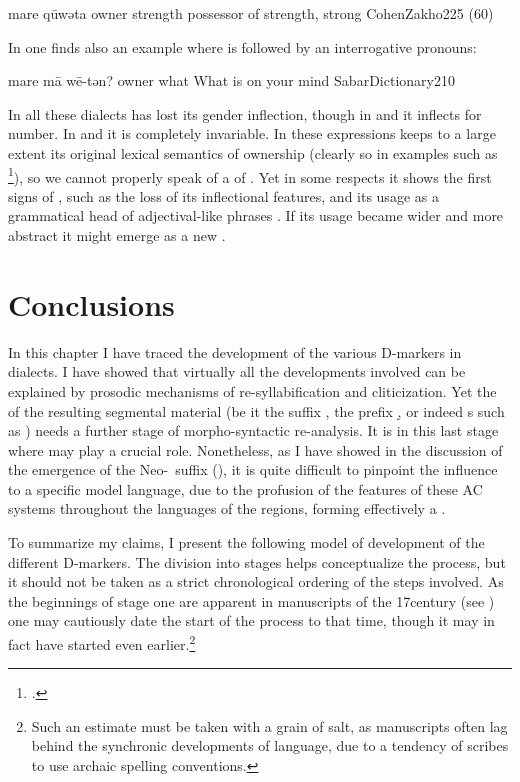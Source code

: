 {
{mare qūwəta}
{owner strength}
{possessor of strength, strong}
{CohenZakho}{225 (60)}

In \JZax one finds also an example where  is followed by an interrogative pronouns:

{mare mā wē-tən?}
{owner what \masc}
{What is on your mind}
{SabarDictionary}{210}

In all these dialects  has lost its gender inflection, though in \Alq and \JSul it inflects for number. In \Qar and \JZax it is completely invariable. In these expressions  keeps to a large extent its original lexical semantics of ownership (clearly so in examples such as \JZax {}\footcite[224]{CohenZakho}), so we cannot properly speak of a    of . Yet  in some respects it shows the first signs of , such as the loss of its inflectional features, and its usage as a grammatical head of adjectival-like phrases . If its usage became wider and more abstract it might emerge as a new \lnk*.



\section{Conclusions}

In this chapter I have traced the development of the various D-markers in  dialects. I have showed that virtually all the developments involved can be explained by prosodic mechanisms of re-syllabification and cliticization. Yet  the  of the resulting segmental material (be it the suffix \ed, the \gen* prefix \d, or indeed \lnk*s such as ) needs a further stage of morpho-syntactic re-analysis. It is in this last stage where  may play a crucial role. Nonetheless, as I have showed in the discussion of the emergence of the Neo-\cst\ suffix \ed (), it is quite difficult to pinpoint the influence to a specific model language, due to the profusion of the features of these AC systems throughout the languages of the regions, forming effectively a . 

To summarize my claims, I present the following model of development of the different D-markers. The division into stages helps conceptualize the process, but it should not be taken as a strict chronological ordering of the steps involved. As the beginnings of stage one are apparent in manuscripts of the 17\th century (see ) one may cautiously date the start of the process to that time, though it may in fact have started even earlier.\footnote{Such an estimate must be taken with a grain of salt, as manuscripts often lag behind the synchronic developments of language, due to a tendency of scribes to use archaic spelling conventions.}

}
